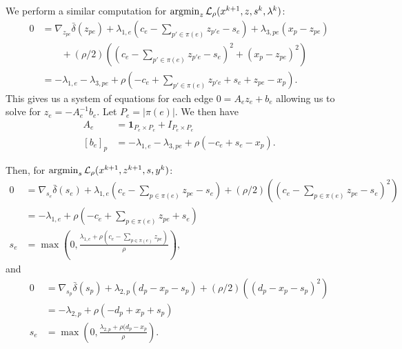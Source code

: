 \documentclass[11pt]{article}
\begin{document}
We perform a similar computation for $\operatorname*{argmin}_{z} \mathcal{L}_\rho(x^{k+1},z,s^k,\lambda^k)$:
\begin{align*}
0
&= \nabla_{z_{pe}}\bar\delta(z_{pe}) + \lambda_{1,e}(c_e - \sum_{p'\in\pi(e)} z_{p'e} - s_{e})
    + \lambda_{3,pe}(x_p - z_{pe})\\
& \qquad + (\rho/2)((c_e - \sum_{p'\in\pi(e)} z_{p'e} - s_e)^2 + (x_p - z_{pe})^2)\\
&= -\lambda_{1,e} - \lambda_{3,pe}
    + \rho(-c_e + \sum_{p'\in\pi(e)} z_{p'e} + s_e  + z_{pe} - x_p).
\end{align*}
This gives us a system of equations for each edge $0 = A_ez_e + b_e$
allowing us to solve for $z_e = -A_e^{-1}b_e$.
Let $P_e= |\pi(e)|$. We then have
\begin{align*}
A_e &= \mathbf{1}_{P_e\times P_e} + I_{P_e\times P_e}\\
[b_e]_p &= -\lambda_{1,e} - \lambda_{3,pe}
    + \rho(-c_e + s_e - x_p).
\end{align*}

Then, for $\operatorname*{argmin}_{s} \mathcal{L}_\rho(x^{k+1},z^{k+1},s,y^k)$:
\begin{align*}
0
&= \nabla_{s_{e}}\bar\delta(s_{e}) + \lambda_{1,e}(c_e - \sum_{p\in\pi(e)} z_{pe} - s_{e})
    + (\rho/2)((c_e - \sum_{p\in\pi(e)} z_{pe} - s_{e})^2)\\
&= -\lambda_{1,e} + \rho(-c_e + \sum_{p\in\pi(e)} z_{pe} + s_e)\\
s_{e} &= \max(0,\frac{\lambda_{1,e} + \rho(c_e - \sum_{p\in\pi(e)}z_{pe})}{\rho}),
\end{align*}
and
\begin{align*}
0
&= \nabla_{s_{p}}\bar\delta(s_{p}) + \lambda_{2,p}(d_p - x_p - s_p)
    + (\rho/2)((d_p - x_p - s_{p})^2)\\
&= -\lambda_{2,p} + \rho(-d_p + x_p + s_p)\\
s_{e} &= \max(0,\frac{\lambda_{2,p} + \rho(d_p - x_p}{\rho}).
\end{align*}
\end{document}
